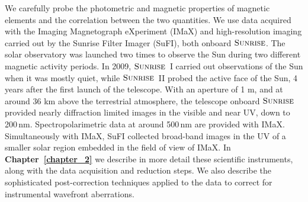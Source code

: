 \documentclass[goettingen, gauss, print]{thesis}
\begin{document}
We carefully probe the photometric and magnetic properties of magnetic elements and the correlation between the two quantities. We use data acquired with the Imaging Magnetograph eXperiment (IMaX) and high-resolution imaging carried out by the Sunrise Filter Imager (SuFI), both onboard $\textsc{Sunrise}$. The solar observatory was launched two times to observe the Sun during two different magnetic activity periods. In 2009, $\textsc{Sunrise}$~I carried out observations of the Sun when it was mostly quiet, while $\textsc{Sunrise}$~II probed the active face of the Sun, 4 years after the first launch of the telescope.
With an aperture of 1 m, and at around 36 km above the terrestrial atmosphere, the telescope onboard $\textsc{Sunrise}$ provided nearly diffraction limited images in the visible and near UV, down to 200\,nm. 
Spectropolarimetric data at around 500\,nm are provided with IMaX. Simultaneously with IMaX, SuFI collected broad-band images in the UV of a smaller solar region embedded in the field of view of IMaX.
In \textbf{Chapter~\ref{chapter_2}} we describe in more detail these scientific instruments, along with the data acquisition and reduction steps. We also describe the sophisticated post-correction techniques applied to the data to correct for instrumental wavefront aberrations.\\
\end{document}
